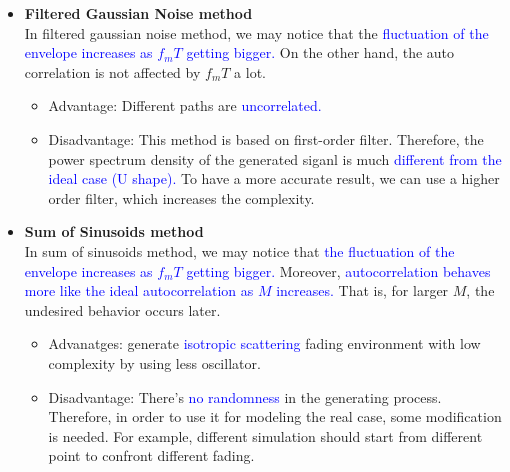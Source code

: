 
\begin{itemize}
    \item \textbf{Filtered Gaussian Noise method} \hfill \\
    In filtered gaussian noise method, we may notice that the \textcolor{blue}{fluctuation of the 
    envelope increases as $f_mT$ getting bigger.} On the other hand, the auto correlation is not affected 
    by $f_mT$ a lot.
    \begin{itemize}
        \item Advantage: Different paths are \textcolor{blue}{uncorrelated.}
        \item Disadvantage: This method is based on first-order filter. Therefore, the power 
        spectrum density of the generated siganl is much \textcolor{blue}{different from the ideal case 
        (U shape).} To have a more accurate result, we can use a higher order filter, which increases the complexity.
    \end{itemize}
    \item \textbf{Sum of Sinusoids method} \hfill \\
    In sum of sinusoids method, we may notice that \textcolor{blue}{the fluctuation of the envelope 
    increases as $f_mT$ getting bigger.} Moreover, \textcolor{blue}{autocorrelation behaves more like the ideal 
    autocorrelation as $M$ increases.} That is, for larger $M$, the undesired behavior occurs 
    later.
    \begin{itemize}
        \item Advanatges: generate \textcolor{blue}{isotropic scattering} fading environment with low complexity 
        by using less oscillator.
        \item Disadvantage: There's \textcolor{blue}{no randomness} in the generating process. Therefore, in order
        to use it for modeling the real case, some modification is needed. For example, different 
        simulation should start from different point to confront different fading.
    \end{itemize}
\end{itemize}